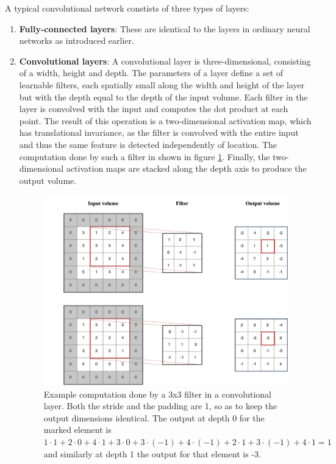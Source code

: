 \documentclass[12pt,a4paper,twoside,openright]{report}
\begin{document}
A typical convolutional network constists of three types of layers:
\begin{enumerate}
	\item \textbf{Fully-connected layers}: These are identical to the layers in ordinary neural networks as introduced earlier.
	\item \textbf{Convolutional layers}: A convolutional layer is three-dimensional, consisting of a width, height and depth. The parameters of a layer define a set of learnable filters, each spatially small along the width and height of the layer but with the depth equal to the depth of the input volume. Each filter in the layer is convolved with the input and computes the dot product at each point. The result of this operation is a two-dimensional activation map, which has translational invariance, as the filter is convolved with the entire input and thus the same feature is detected independently of location. The computation done by such a filter in shown in figure \ref{fig:conv_example}. Finally, the two-dimensional activation maps are stacked along the depth axis to produce the output volume.
	
	\begin{figure}
		\centering
		\includegraphics[scale=0.6]{conv_example}
		\caption[Example computation done by a 3x3 filter in a convolutional layer]{Example computation done by a 3x3 filter in a convolutional layer. Both the stride and the padding are 1, so as to keep the output dimensions identical. The output at depth 0 for the marked element is $1 \cdot 1 + 2 \cdot 0 + 4 \cdot 1 + 3 \cdot 0 + 3 \cdot (-1) + 4 \cdot (-1) + 2 \cdot 1 + 3 \cdot (-1) + 4 \cdot 1 = 1$ and similarly at depth 1 the output for that element is -3.}
		\label{fig:conv_example}
	\end{figure}


\end{enumerate}
\end{document}
